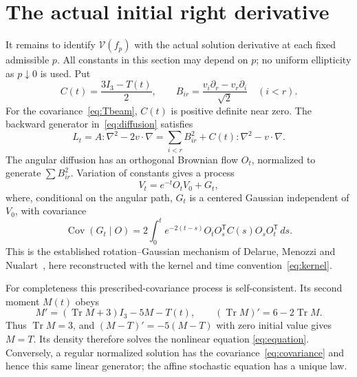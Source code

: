 \documentclass[11pt]{article}
\numberwithin{equation}{section}
\newcommand{\tr}{\operatorname{Tr}}
\begin{document}
\section{The actual initial right derivative}\label{sec:flow}

It remains to identify \(\mathcal V(f_p)\) with the actual solution
derivative at each fixed admissible \(p\). All constants in this section
may depend on \(p\); no uniform ellipticity as \(p\downarrow0\) is used.
Put
\[
 C(t)=\frac{3I_3-T(t)}2,\qquad
 B_{ir}=\frac{v_i\partial_r-v_r\partial_i}{\sqrt2}\quad(i<r).
\]
For the covariance~\eqref{eq:Tbeam}, \(C(t)\) is positive definite
near zero. The backward generator in~\eqref{eq:diffusion} satisfies
\begin{equation}\label{eq:angular}
 L_t=A:\nabla^2-2v\cdot\nabla
       =\sum_{i<r}B_{ir}^2+C(t):\nabla^2-v\cdot\nabla.
\end{equation}
The angular diffusion has an orthogonal Brownian flow \(O_t\),
normalized to generate \(\sum B_{ir}^2\). Variation of constants
gives a process
\begin{equation}\label{eq:affine}
 V_t=e^{-t}O_tV_0+G_t,
\end{equation}
where, conditional on the angular path, \(G_t\) is a centered Gaussian
independent of \(V_0\), with covariance
\begin{equation}\label{eq:noise}
 \operatorname{Cov}(G_t\mid O)
 =2\int_0^t e^{-2(t-s)}O_tO_s^{\mathsf T}C(s)O_sO_t^{\mathsf T}\,ds.
\end{equation}
This is the established rotation--Gaussian mechanism of
Delarue, Menozzi and Nualart~\cite[Proposition 2.3]{DMN2014}, here
reconstructed with the kernel and time convention~\eqref{eq:kernel}.

For completeness this prescribed-covariance process is self-consistent.
Its second moment \(M(t)\) obeys
\[
 M'=(\tr M+3)I_3-5M-T(t),\qquad
 (\tr M)'=6-2\tr M.
\]
Thus \(\tr M=3\), and \((M-T)'=-5(M-T)\) with zero initial value
gives \(M=T\). Its density therefore solves the nonlinear equation
\eqref{eq:equation}. Conversely, a regular normalized solution has the
covariance~\eqref{eq:covariance} and hence this same linear generator;
the affine stochastic equation has a unique law.
\end{document}
